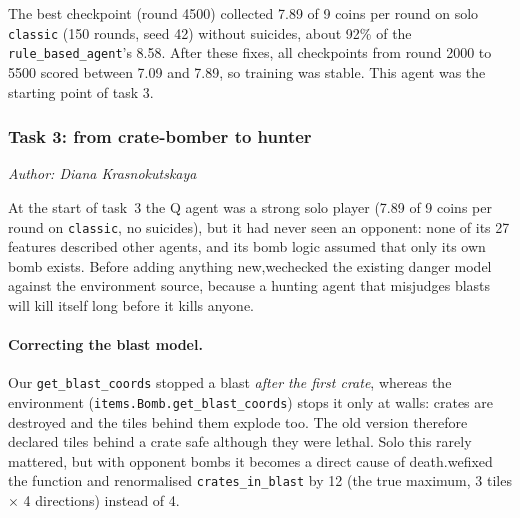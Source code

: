\documentclass[11pt]{article}
\newcommand{\authorline}[1]{\noindent\textit{Author: #1}\par\medskip}
\newcommand{\code}[1]{\texttt{#1}}
\begin{document}
The best checkpoint (round 4500) collected 7.89 of 9 coins per round on solo
\code{classic} (150 rounds, seed 42) without suicides, about 92\% of the \code{rule\_based\_agent}'s 8.58.
After these fixes, all checkpoints from round 2000 to 5500 scored between 7.09 and 7.89,
so training was stable. This agent was the starting point of task 3.

\subsubsection{Task 3: from crate-bomber to hunter}
\label{sec:q-task3-training}
\authorline{Diana Krasnokutskaya}

At the start of task~3 the Q agent was a strong solo player (7.89 of 9 coins per round on \code{classic}, no suicides), but it had never seen an opponent: none of its 27 features described other agents, and its bomb logic assumed that only its own bomb exists. Before adding anything new,wechecked the existing danger model against the environment source, because a hunting agent that misjudges blasts will kill itself long before it kills anyone.

\paragraph{Correcting the blast model.}
Our \code{get\_blast\_coords} stopped a blast \emph{after the first crate}, whereas the environment (\code{items.Bomb.get\_blast\_coords}) stops it only at walls: crates are destroyed and the tiles behind them explode too. The old version therefore declared tiles behind a crate safe although they were lethal. Solo this rarely mattered, but with opponent
bombs it becomes a direct cause of death.wefixed the function and renormalised \code{crates\_in\_blast} by 12 (the true maximum, 3 tiles $\times$ 4 directions) instead of 4.
\end{document}
